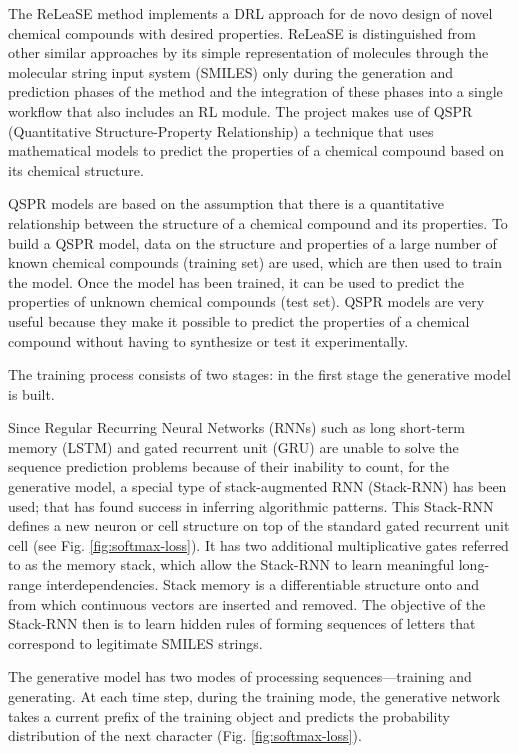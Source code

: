 \documentclass[a4paper]{article}
\begin{document}
The ReLeaSE \cite{reinforcement-learning} method implements a DRL approach for de novo design of novel chemical compounds with desired properties. ReLeaSE is distinguished from other similar approaches by its simple representation of molecules through the molecular string input system (SMILES) only during the generation and prediction phases of the method and the integration of these phases into a single workflow that also includes an RL module. 
The project makes use of QSPR (Quantitative Structure-Property Relationship) a technique that uses mathematical models to predict the properties of a chemical compound based on its chemical structure. 


QSPR models are based on the assumption that there is a quantitative relationship between the structure of a chemical compound and its properties. To build a QSPR model, data on the structure and properties of a large number of known chemical compounds (training set) are used, which are then used to train the model. Once the model has been trained, it can be used to predict the properties of unknown chemical compounds (test set). QSPR models are very useful because they make it possible to predict the properties of a chemical compound without having to synthesize or test it experimentally.


The training process consists of two stages: in the first stage the generative model is built.


Since Regular Recurring Neural Networks (RNNs) such as long short-term memory (LSTM) \cite{lstm} and gated recurrent unit (GRU) \cite{gru} are unable to solve the sequence prediction problems because of their inability to count, for the generative model, a special type of stack-augmented RNN (Stack-RNN) \cite{stack-rnn} has been used; that has found success in inferring algorithmic patterns. This Stack-RNN defines a new neuron or cell structure on top of the standard gated recurrent unit \cite{grnn} cell (see Fig. \ref{fig:softmax-loss}). It has two additional multiplicative gates referred to as the memory stack, which allow the Stack-RNN to learn meaningful long-range interdependencies. Stack memory is a differentiable structure onto and from which continuous vectors are inserted and removed. The objective of the Stack-RNN then is to learn hidden rules of forming sequences of letters that correspond to legitimate SMILES strings.


The generative model has two modes of processing sequences—training and generating.  
At each time step, during the training mode, the generative network takes a current prefix of the training object and predicts the probability distribution of the next character (Fig. \ref{fig:softmax-loss}). 
\end{document}
